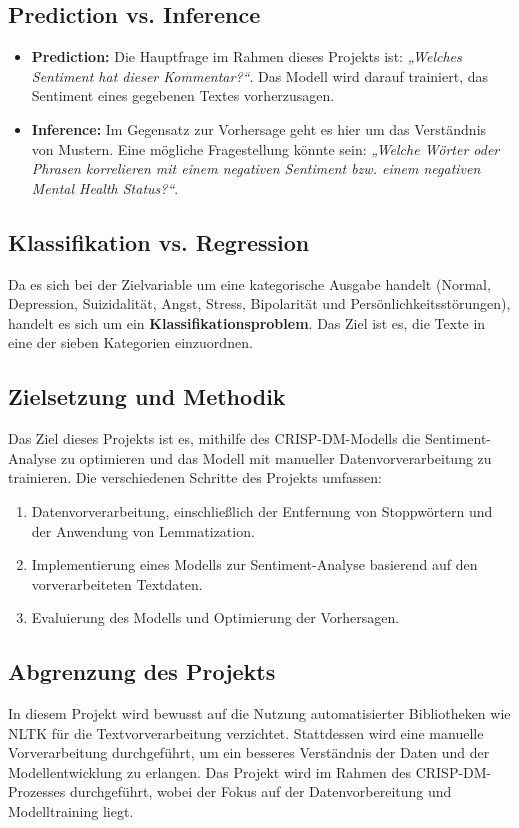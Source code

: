 \subsection{Prediction vs. Inference}
\begin{itemize}
    \item \textbf{Prediction:} Die Hauptfrage im Rahmen dieses Projekts ist: \textit{„Welches Sentiment hat dieser Kommentar?“}. Das Modell wird darauf trainiert, das Sentiment eines gegebenen Textes vorherzusagen.

    \item \textbf{Inference:} Im Gegensatz zur Vorhersage geht es hier um das Verständnis von Mustern. Eine mögliche Fragestellung könnte sein: \textit{„Welche Wörter oder Phrasen korrelieren mit einem negativen Sentiment bzw. einem negativen Mental Health Status?“}.
\end{itemize}

\subsection{Klassifikation vs. Regression}
Da es sich bei der Zielvariable um eine kategorische Ausgabe handelt (Normal, Depression, Suizidalität, Angst, Stress, Bipolarität und Persönlichkeitsstörungen), handelt es sich um ein \textbf{Klassifikationsproblem}. Das Ziel ist es, die Texte in eine der sieben Kategorien einzuordnen.

\subsection{Zielsetzung und Methodik}
Das Ziel dieses Projekts ist es, mithilfe des CRISP-DM-Modells die Sentiment-Analyse zu optimieren und das Modell mit manueller Datenvorverarbeitung zu trainieren. Die verschiedenen Schritte des Projekts umfassen:
\begin{enumerate}
    \item Datenvorverarbeitung, einschließlich der Entfernung von Stoppwörtern und der Anwendung von Lemmatization.
    \item Implementierung eines Modells zur Sentiment-Analyse basierend auf den vorverarbeiteten Textdaten.
    \item Evaluierung des Modells und Optimierung der Vorhersagen.
\end{enumerate}

\newpage

\subsection{Abgrenzung des Projekts}
In diesem Projekt wird bewusst auf die Nutzung automatisierter Bibliotheken wie NLTK für die Textvorverarbeitung verzichtet. Stattdessen wird eine manuelle Vorverarbeitung durchgeführt, um ein besseres Verständnis der Daten und der Modellentwicklung zu erlangen. Das Projekt wird im Rahmen des CRISP-DM-Prozesses durchgeführt, wobei der Fokus auf der Datenvorbereitung und Modelltraining liegt.